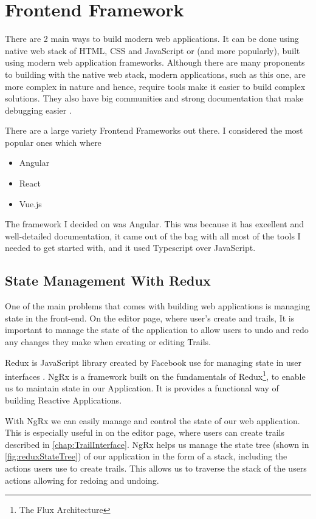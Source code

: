\section{Frontend Framework} \label{sec:frontendFramework}
There are 2 main ways to build modern web applications. It can be done using native web stack of HTML, CSS and JavaScript or (and more popularly), built using modern web application frameworks. Although there are many proponents to building with the native web stack, modern applications, such as this one, are more complex in nature and hence, require tools make it easier to build complex solutions. They also have big communities and strong documentation that make debugging easier \cite{medium:WhyModernJSFrameworkExist}.

There are a large variety Frontend Frameworks out there. I considered the most popular ones which where
\begin{itemize}
    \item Angular \cite{angular}
    \item React \cite{react}
    \item Vue.js \cite{vuejs}
\end{itemize}

The framework I decided on was Angular. This was because it has excellent and well-detailed documentation, it came out of the bag with all most of the tools I needed to get started with, and it used Typescript over JavaScript.

\subsection{State Management With Redux}
One of the main problems that comes with building web applications is managing state in the \gls{front-end}. On the editor page, where user's create and trails, It is important to manage the state of the application to allow users to undo and redo any changes they make when creating or editing Trails.

Redux is JavaScript library created by Facebook use for managing state in user interfaces \cite{wiki:Redux}. NgRx \cite{cheng2018state} is a framework built on the fundamentals of Redux\footnote{The Flux Architecture}, to enable us to maintain state in our Application. It is provides a functional way of building Reactive Applications.

With NgRx we can easily manage and control the state of our web application. This is especially useful in on the editor page, where users can create trails described in \autoref{chap:TrailInterface}. NgRx helps us manage the state tree (shown in \autoref{fig:reduxStateTree}) of our application in the form of a stack, including the actions users use to create trails. This allows us to traverse the stack of the users actions allowing for redoing and undoing.

